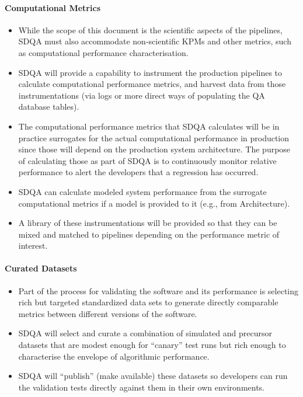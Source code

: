 \paragraph{Computational Metrics}
\label{sec:qaComputational}
\begin{itemize}

\item While the scope of this document is the scientific aspects of the pipelines, SDQA must also accommodate non-scientific KPMs and other metrics, such as computational performance characterisation.

\item SDQA will provide a capability to instrument the production pipelines to calculate computational performance metrics, and harvest data from those instrumentations (via logs or more direct ways of populating the QA database tables).

\item The computational performance metrics that SDQA calculates will be in practice surrogates for the actual computational performance in production since those will depend on the production system architecture. The purpose of calculating those as part of SDQA is to continuously monitor relative performance to alert the developers that a regression has occurred.

\item SDQA can calculate modeled system performance from the surrogate computational metrics if a model is provided to it (e.g., from Architecture).

\item A library of these instrumentations will be provided so that they can be mixed and matched to pipelines depending on the performance metric of interest.

\end{itemize}

\paragraph{Curated Datasets}
\label{sec:qaCurateddata}
\begin{itemize}

\item Part of the process for validating the software and its performance is selecting rich but targeted standardized data sets to generate directly comparable metrics between different versions of the software.

\item SDQA will select and curate a combination of simulated and precursor datasets that are modest enough for ``canary'' test runs but rich enough to characterise the envelope of algorithmic performance.

\item SDQA will ``publish'' (make available) these datasets so developers can run the validation tests directly against them in their own environments.

\end{itemize}


